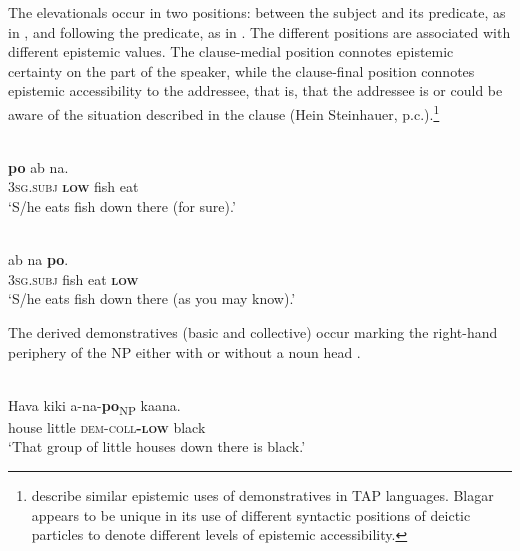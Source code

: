 The elevationals occur in two positions: between the subject and its predicate, as in , and following the predicate, as in . The different positions are associated with different epistemic values. The clause-medial position connotes epistemic certainty on the part of the speaker, while the clause-final position connotes epistemic accessibility to the addressee, that is, that the addressee is or could be aware of the situation described in the clause (Hein Steinhauer, p.c.).\footnote{\citet{SchapperEtAl2011demnom} describe similar epistemic uses of demonstratives in TAP languages. Blagar appears to be unique in its use of different syntactic positions of deictic particles to denote different levels of epistemic accessibility.}  



\ea%
\label{ex:7:13}
 \\
 \textbf{{po}} {ab}    {na.} \\
    \textsc{3sg.subj} \textbf{\textsc{low}} fish  eat\\
\glt  `S/he eats fish down there (for sure).'
\z

 

 
\ea%
\label{ex:7:14}
 \\
  ab    na \textbf{{po}}{.}\\
  \textsc{3sg.subj} fish  eat  \textbf{\textsc{low}}   \\
\glt   `S/he eats fish down there (as you may know).'
\z
 


  





The derived demonstratives (basic and collective) occur marking the right-hand periphery of the NP either with  or without a noun head .



\ea%
\label{ex:7:15}
 \\
\gll {\ob}Hava  kiki  {\textglotstop}a-na-\textbf{po}{\cb}\textsubscript{NP} ka{\textglotstop}ana.\\
    house  little  \textsc{dem-coll}\textbf{\textsc{-low}} black \\
\glt `That group of little houses down there is black.'
\z

